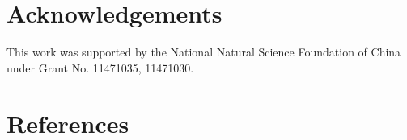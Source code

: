 \documentclass[review]{elsarticle}
\theoremstyle{plain}
\theoremstyle{definition}
\theoremstyle{remark}
\begin{document}
\section*{Acknowledgements}
This work was supported by the National Natural Science Foundation of China under Grant No. 11471035, 11471030.


\section*{References}


\end{document}
